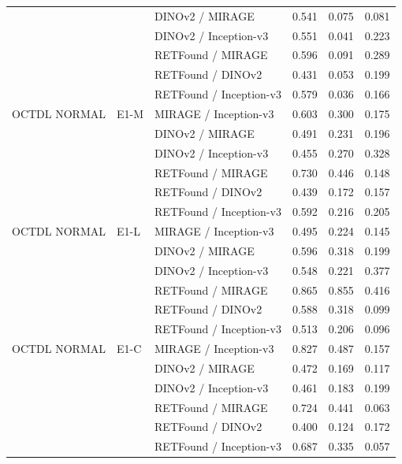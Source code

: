 \begin{longtable}{@{}lllccc@{}}
 &  & DINOv2 / MIRAGE & 0.541 & 0.075 & 0.081 \\
 &  & DINOv2 / Inception-v3 & 0.551 & 0.041 & 0.223 \\
 &  & RETFound / MIRAGE & 0.596 & 0.091 & 0.289 \\
 &  & RETFound / DINOv2 & 0.431 & 0.053 & 0.199 \\
 &  & RETFound / Inception-v3 & 0.579 & 0.036 & 0.166 \\
\addlinespace[1pt]
OCTDL NORMAL & E1-M & MIRAGE / Inception-v3 & 0.603 & 0.300 & 0.175 \\
 &  & DINOv2 / MIRAGE & 0.491 & 0.231 & 0.196 \\
 &  & DINOv2 / Inception-v3 & 0.455 & 0.270 & 0.328 \\
 &  & RETFound / MIRAGE & 0.730 & 0.446 & 0.148 \\
 &  & RETFound / DINOv2 & 0.439 & 0.172 & 0.157 \\
 &  & RETFound / Inception-v3 & 0.592 & 0.216 & 0.205 \\
\addlinespace[1pt]
OCTDL NORMAL & E1-L & MIRAGE / Inception-v3 & 0.495 & 0.224 & 0.145 \\
 &  & DINOv2 / MIRAGE & 0.596 & 0.318 & 0.199 \\
 &  & DINOv2 / Inception-v3 & 0.548 & 0.221 & 0.377 \\
 &  & RETFound / MIRAGE & 0.865 & 0.855 & 0.416 \\
 &  & RETFound / DINOv2 & 0.588 & 0.318 & 0.099 \\
 &  & RETFound / Inception-v3 & 0.513 & 0.206 & 0.096 \\
\addlinespace[1pt]
OCTDL NORMAL & E1-C & MIRAGE / Inception-v3 & 0.827 & 0.487 & 0.157 \\
 &  & DINOv2 / MIRAGE & 0.472 & 0.169 & 0.117 \\
 &  & DINOv2 / Inception-v3 & 0.461 & 0.183 & 0.199 \\
 &  & RETFound / MIRAGE & 0.724 & 0.441 & 0.063 \\
 &  & RETFound / DINOv2 & 0.400 & 0.124 & 0.172 \\
 &  & RETFound / Inception-v3 & 0.687 & 0.335 & 0.057 \\
\end{longtable}
